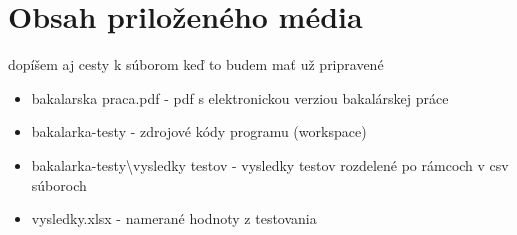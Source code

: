 \documentclass[11pt,twoside,slovak,a4paper]{article}
\begin{document}
 	
 	
 
	\newpage
	\section{Obsah priloženého média}
	
	dopíšem aj cesty k súborom keď to budem mať už pripravené
	\begin{itemize}
		\item 	bakalarska praca.pdf - pdf s elektronickou verziou bakalárskej práce
		\item	bakalarka-testy - zdrojové kódy programu (workspace)
		\item 	bakalarka-testy\textbackslash vysledky testov - vysledky testov rozdelené po rámcoch v csv súboroch  
		\item	vysledky.xlsx - namerané hodnoty z testovania
	\end{itemize}

	

	

	
\end{document}
